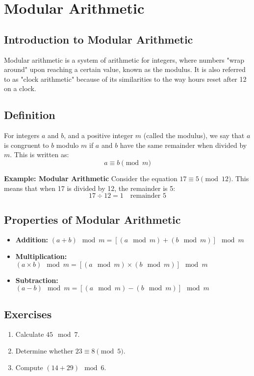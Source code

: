 \documentclass{article}
\begin{document}
\section{Modular Arithmetic}
\subsection{Introduction to Modular Arithmetic}
Modular arithmetic is a system of arithmetic for integers, where numbers "wrap around" upon reaching a certain value, known as the modulus. It is also referred to as "clock arithmetic" because of its similarities to the way hours reset after 12 on a clock.

\subsection{Definition}
For integers \( a \) and \( b \), and a positive integer \( m \) (called the modulus), we say that \( a \) is congruent to \( b \) modulo \( m \) if \( a \) and \( b \) have the same remainder when divided by \( m \). This is written as:
\[
a \equiv b \pmod{m}
\]

\textbf{Example: Modular Arithmetic}
Consider the equation \( 17 \equiv 5 \pmod{12} \). This means that when 17 is divided by 12, the remainder is 5:
\[
17 \div 12 = 1 \quad \text{remainder } 5
\]

\subsection{Properties of Modular Arithmetic}
\begin{itemize}
    \item \textbf{Addition:} \( (a + b) \mod m = [(a \mod m) + (b \mod m)] \mod m \)
    \item \textbf{Multiplication:} \( (a \times b) \mod m = [(a \mod m) \times (b \mod m)] \mod m \)
    \item \textbf{Subtraction:} \( (a - b) \mod m = [(a \mod m) - (b \mod m)] \mod m \)
\end{itemize}

\subsection{Exercises}
\begin{enumerate}
    \item Calculate \( 45 \mod 7 \).
    \item Determine whether \( 23 \equiv 8 \pmod{5} \).
    \item Compute \( (14 + 29) \mod 6 \).
\end{enumerate}
\end{document}
